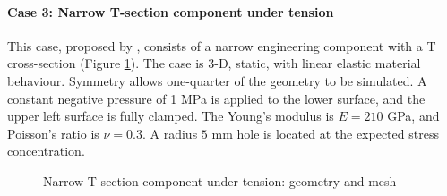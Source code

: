 \documentclass[sn-mathphys,Numbered]{sn-jnl}%
\begin{document}
\paragraph{Case 3: Narrow T-section component under tension}
This case, proposed by \citet{Demirdzic1997a}, consists of a narrow engineering component with a T cross-section (Figure \ref{fig:narrowTmember}).
The case is 3-D, static, with linear elastic material behaviour.
Symmetry allows one-quarter of the geometry to be simulated.
A constant negative pressure of 1 MPa is applied to the lower surface, and the upper left surface is fully clamped.
The Young’s modulus is $E = 210$ GPa, and Poisson’s ratio is $\nu = 0.3$.
A radius $5$ mm hole is located at the expected stress concentration.
\begin{figure}[htbp]
	\centering
   	\qquad
	\caption{Narrow T-section component under tension: geometry and mesh}
	\label{fig:narrowTmember}
\end{figure}
\end{document}
